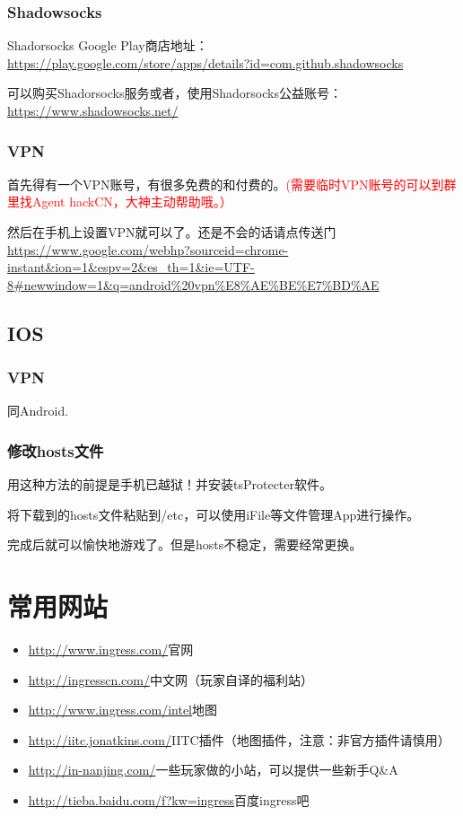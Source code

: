 \documentclass[a4paper]{article}
\begin{document}
\subsubsection{Shadowsocks}
Shadorsocks Google Play商店地址：\\
\url{https://play.google.com/store/apps/details?id=com.github.shadowsocks}\par
可以购买Shadorsocks服务或者，使用Shadorsocks公益账号：\\
\url{https://www.shadowsocks.net/}

\subsubsection{VPN}
首先得有一个VPN账号，有很多免费的和付费的。\textcolor{red}{(需要临时VPN账号的可以到群里找Agent hackCN，大神主动帮助哦。）}\par
然后在手机上设置VPN就可以了。还是不会的话请点传送门\\
\url{https://www.google.com/webhp?sourceid=chrome-instant&ion=1&espv=2&es_th=1&ie=UTF-8#newwindow=1&q=android\%20vpn\%E8\%AE\%BE\%E7\%BD\%AE}

\subsection{IOS}
\subsubsection{VPN}
同Android.

\subsubsection{修改hosts文件}
用这种方法的前提是手机已越狱！并安装tsProtecter软件。\par
将下载到的hosts文件粘贴到/etc，可以使用iFile等文件管理App进行操作。\par
完成后就可以愉快地游戏了。但是hosts不稳定，需要经常更换。

\section{常用网站}
\begin{itemize}
\item \url{http://www.ingress.com/}官网~
\item \url{http://ingresscn.com/}中文网（玩家自译的福利站）
\item \url{http://www.ingress.com/intel}地图
\item \url{http://iitc.jonatkins.com/}IITC插件（地图插件，注意：非官方插件请慎用）
\item \url{http://in-nanjing.com/}一些玩家做的小站，可以提供一些新手Q\&A
\item \url{http://tieba.baidu.com/f?kw=ingress}百度ingress吧

\end{itemize}
\end{document}
